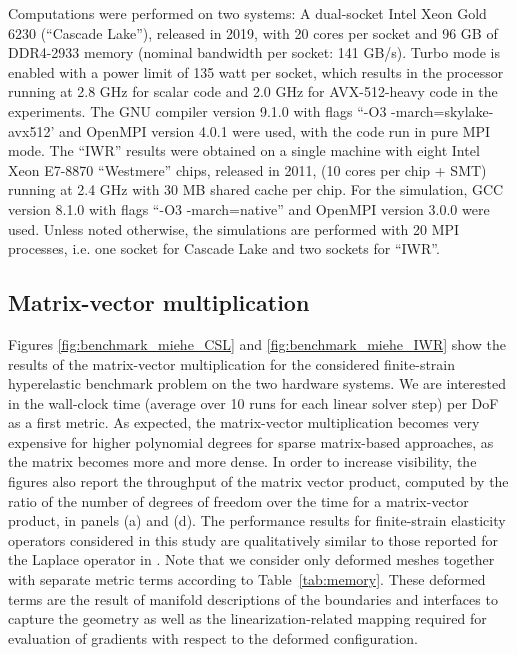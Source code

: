 \documentclass[AMA,STIX1COL]{WileyNJD-v2}
\begin{document}
{\color{red}
Computations were performed on two systems: A dual-socket Intel Xeon Gold 6230 (``Cascade Lake''), released in 2019, with 20 cores per socket and 96 GB of DDR4-2933 memory (nominal bandwidth per socket: 141 GB/s). Turbo mode is enabled with a power limit of 135 watt per socket, which results in the processor running at 2.8 GHz for scalar code and 2.0 GHz for AVX-512-heavy code in the experiments. The GNU compiler version 9.1.0 with flags ``-O3 -march=skylake-avx512' and OpenMPI version 4.0.1 were used, with the code run in pure MPI mode.
}
The ``IWR'' results were obtained on a single machine with eight Intel Xeon E7-8870 ``Westmere'' chips, released in 2011, (10 cores per chip  + SMT) running at 2.4 GHz with 30 MB shared cache per chip. For the simulation, GCC version 8.1.0 with flags ``-O3 -march=native'' and OpenMPI version 3.0.0 were used.
Unless noted otherwise, the simulations are performed with 20 MPI processes, i.e. one socket for Cascade Lake and two sockets for ``IWR''.

\subsection{Matrix-vector multiplication}


Figures \ref{fig:benchmark_miehe_CSL} and \ref{fig:benchmark_miehe_IWR} show the results of the matrix-vector multiplication for the considered finite-strain hyperelastic benchmark problem on the two hardware systems.
We are interested in the wall-clock time (average over 10 runs for each linear solver step) per DoF as a first metric.
As expected, the matrix-vector multiplication becomes very expensive for higher {\color{red}polynomial degrees} for sparse matrix-based approaches,
as the matrix becomes more and more dense.
{\color{red}
In order to increase visibility, the figures also report the throughput of the matrix vector product, computed by the ratio of the number of degrees of freedom over the time for a matrix-vector product, in panels (a) and (d).
}
The performance results for finite-strain elasticity operators considered in this study are qualitatively similar to those reported for the Laplace operator in \cite{kronbichler12}.
{\color{red}
Note that we consider only deformed meshes together with separate metric terms according to Table~\ref{tab:memory}. These deformed terms are the result of manifold descriptions of the boundaries and interfaces  to capture the geometry as well as
the linearization-related mapping required for evaluation of gradients with respect to the deformed configuration.
}
\end{document}
